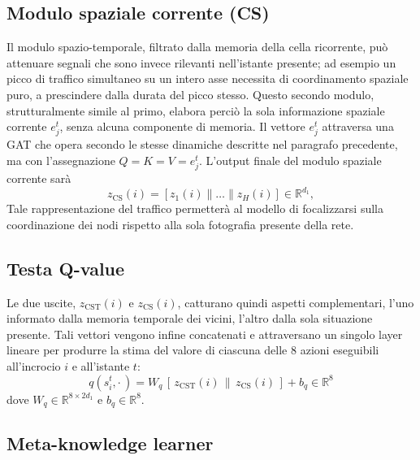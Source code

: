 \subsection{Modulo spaziale corrente (CS)}
\label{subsec:cs-module}

Il modulo spazio-temporale, filtrato dalla memoria della cella ricorrente,
può attenuare segnali che sono invece rilevanti nell'istante
presente; ad esempio un picco di traffico simultaneo su un intero asse
necessita di coordinamento spaziale puro, a prescindere dalla durata del picco stesso.
Questo secondo modulo, strutturalmente simile al primo,
elabora perciò la sola informazione spaziale corrente $e_j^t$, senza alcuna
componente di memoria.
Il vettore $e_j^t$ attraversa una GAT che opera secondo le stesse dinamiche descritte
nel paragrafo precedente, ma con l'assegnazione $Q=K=V=e_j^t$.
L'output finale del modulo spaziale corrente sarà
\[ z_{\mathrm{CS}}(i) = [z_1(i) \| \dots \| z_H(i)] \in \mathbb{R}^{d_1} ,\]
Tale rappresentazione del traffico permetterà al modello di focalizzarsi sulla coordinazione dei nodi rispetto alla sola fotografia presente della rete.

\subsection{Testa Q-value}
\label{subsec:q-head}

Le due uscite, $z_{\mathrm{CST}}(i)$ e $z_{\mathrm{CS}}(i)$, catturano
quindi aspetti complementari, l'uno informato dalla memoria temporale dei
vicini, l'altro dalla sola situazione presente. Tali vettori vengono infine concatenati e attraversano un singolo layer lineare per
produrre la stima del valore di ciascuna delle 8 azioni eseguibili all'incrocio $i$ e all'istante $t$:
\begin{equation}
  q(s_i^t, \cdot\,) = W_q\,[\,z_{\mathrm{CST}}(i) \,\|\, z_{\mathrm{CS}}(i)\,] + b_q \in \mathbb{R}^{8}
\end{equation}
dove $W_q \in \mathbb{R}^{8 \times 2 d_1}$ e $b_q \in \mathbb{R}^{8}$.

\subsection{Meta-knowledge learner}

